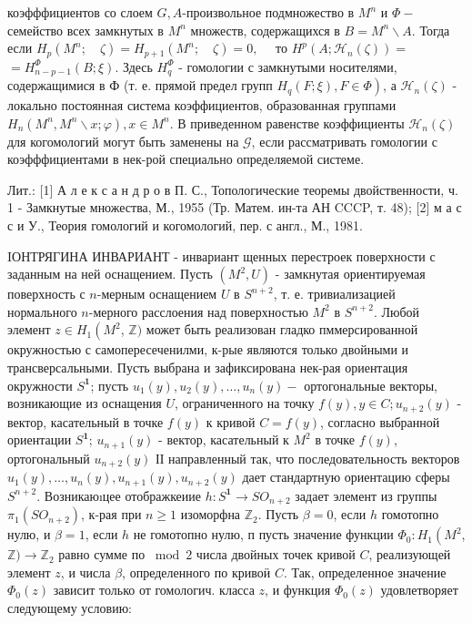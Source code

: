 \documentclass[10pt]{article}
\begin{document}
коэфффициентов со слоем $G, A$-произвольное подмножество в $M^{n}$ и $\Phi-$ семейство всех замкнутых в $M^{n}$ множеств, содержащихся в $B=M^{n} \backslash A$. Тогда если $H_{p}\left(M^{n} ; \quad \zeta\right)=H_{p+1}\left(M^{n} ; \quad \zeta\right)=0, \quad$ то $H^{p}\left(A ; \mathscr{H}_{n}(\zeta)\right)=$ $=H_{n-p-1}^{\Phi}(B ; \xi)$. Здесь $H_{q}^{\Phi}$ - гомологии с замкнутыми носителями, содержащимися в $Ф$ (т. е. прямой предел групп $\left.H_{q}(F ; \xi), F \in \Phi\right)$, а $\mathscr{H}_{n}(\zeta)$ - локально постоянная система коэффициентов, образованная группами $H_{n}\left(M^{n}, M^{n} \backslash x ; \varphi\right), x \in M^{n}$. В приведенном равенстве коэффициенты $\mathscr{H}_{n}(\zeta)$ для когомологий могут быть заменены на $\mathscr{G}$, если рассматривать гомологии с коэфффициентами в нек-рой специально определяемой системе.



Лит.: [1] А л е к с а н д р о в П. С., Топологические теоремы двойственности, ч. 1 - Замкнутые множества, М., 1955 (Тр. Матем. ин-та АН CCCP, т. 48); [2] м а с с и У., Теория гомологий и когомологий, пер. с англ., М., 1981.



IОНТРЯГИНА ИНВАРИАНТ - инвариант щенных перестроек поверхности с заданным на ней оснащением. Пусть $\left(M^{2}, U\right)$ - замкнутая ориентируемая поверхность с $n$-мерным оснащением $U$ в $S^{n+2}$, т. е. тривиализацией нормального $n$-мерного расслоения над поверхностью $M^{2}$ в $S^{n+2}$. Любой элемент $z \in H_{1}\left(M^{2}\right.$, $\mathbb{Z})$ может быть реализован гладко пммерсированной окружностью с самопересеченилми, к-рые являются только двойными и трансверсальными. Пусть выбрана и зафиксирована нек-рая ориентация окружности $S^{\mathbf{1}}$; пусть $u_{1}(y), u_{2}(y), \ldots, u_{n}(y)-$ ортогональные векторы, возникающие из оснащения $U$, ограниченного на точку $f(y), y \in C ; u_{n+2}(y)$ - вектор, касательный в точке $f(y)$ к кривой $C=f(y)$, согласно выбранной ориентации $S^{\mathbf{1}}$; $u_{n+1}(y)$ - вектор, касательный к $M^{2}$ в точке $f(y)$, ортогональный $u_{n+2}(y)$ ІІ направленный так, что последовательность векторов $u_{1}(y), \ldots, u_{n}(y), u_{n+1}(y), u_{n+2}(y)$ дает стандартную ориентацию сферы $S^{n+2}$. Возникаюıцее отображкеиие $h: S^{\mathbf{1}} \rightarrow S O_{n+2}$ задает элемент из группы $\pi_{1}\left(S O_{n+2}\right)$, к-рая при $n \geqslant 1$ изоморфна $\mathbb{Z}_{2}$. Пусть $\beta=0$, если $h$ гомотопно нулю, и $\beta=1$, если $h$ не гомотопно нулю, п пусть значение функции $\Phi_{0}: H_{1}\left(M^{2}\right.$, $\mathbb{Z}) \rightarrow \mathbb{Z}_{2}$ равно сумме по $\bmod 2$ числа двойных точек кривой $C$, реализующей элемент $z$, и числа $\beta$, определенного по кривоӥ $C$. Так, определенное значение $\Phi_{0}(z)$ зависит только от гомологич. класса $z$, и функция $\Phi_{0}(z)$ удовлетворяет следующему условию:
\end{document}
